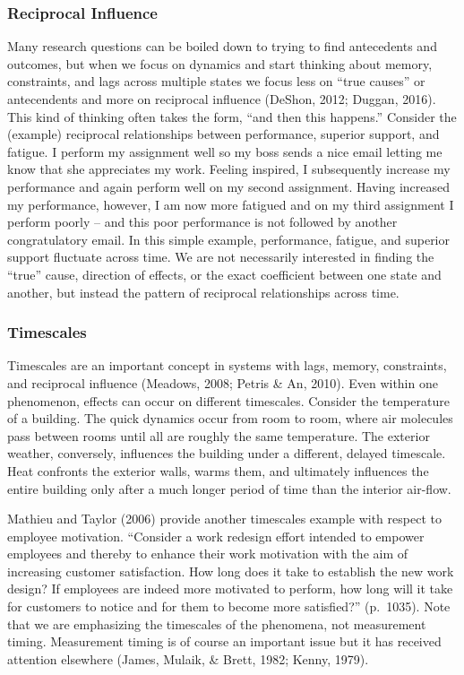 \documentclass[english,,man]{apa6}
\begin{document}
\hypertarget{reciprocal-influence}{%
\subsubsection{Reciprocal Influence}\label{reciprocal-influence}}

Many research questions can be boiled down to trying to find antecedents and outcomes, but when we focus on dynamics and start thinking about memory, constraints, and lags across multiple states we focus less on \enquote{true causes} or antecendents and more on reciprocal influence (DeShon, 2012; Duggan, 2016). This kind of thinking often takes the form, \enquote{and then this happens.} Consider the (example) reciprocal relationships between performance, superior support, and fatigue. I perform my assignment well so my boss sends a nice email letting me know that she appreciates my work. Feeling inspired, I subsequently increase my performance and again perform well on my second assignment. Having increased my performance, however, I am now more fatigued and on my third assignment I perform poorly -- and this poor performance is not followed by another congratulatory email. In this simple example, performance, fatigue, and superior support fluctuate across time. We are not necessarily interested in finding the \enquote{true} cause, direction of effects, or the exact coefficient between one state and another, but instead the pattern of reciprocal relationships across time.

\hypertarget{timescales}{%
\subsubsection{Timescales}\label{timescales}}

Timescales are an important concept in systems with lags, memory, constraints, and reciprocal influence (Meadows, 2008; Petris \& An, 2010). Even within one phenomenon, effects can occur on different timescales. Consider the temperature of a building. The quick dynamics occur from room to room, where air molecules pass between rooms until all are roughly the same temperature. The exterior weather, conversely, influences the building under a different, delayed timescale. Heat confronts the exterior walls, warms them, and ultimately influences the entire building only after a much longer period of time than the interior air-flow.

Mathieu and Taylor (2006) provide another timescales example with respect to employee motivation. \enquote{Consider a work redesign effort intended to empower employees and thereby to enhance their work motivation with the aim of increasing customer satisfaction. How long does it take to establish the new work design? If employees are indeed more motivated to perform, how long will it take for customers to notice and for them to become more satisfied?} (p.~1035). Note that we are emphasizing the timescales of the phenomena, not measurement timing. Measurement timing is of course an important issue but it has received attention elsewhere (James, Mulaik, \& Brett, 1982; Kenny, 1979).
\end{document}
